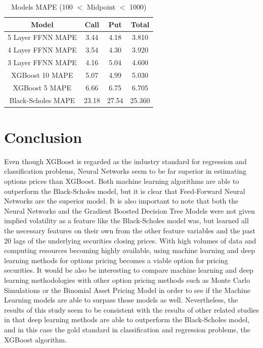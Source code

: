 \documentclass[a4paper]{article}
\begin{document}
\begin{table}[htbp]
\centering
\caption{Models MAPE (100 $<$ Midpoint $<$ 1000)}
\label{table:modelcomparison_mape_filt}
\begin{tabular}{cccc}
\hline
Model & Call & Put & Total \\
\hline
5 Layer FFNN MAPE & 3.44 & 4.18 & 3.810 \\
4 Layer FFNN MAPE & 3.54 & 4.30 & 3.920 \\
3 Layer FFNN MAPE & 4.16 & 5.04 & 4.600 \\
XGBoost 10 MAPE & 5.07 & 4.99 & 5.030 \\
XGBoost 5 MAPE & 6.66 & 6.75 & 6.705 \\
Black-Scholes MAPE & 23.18 & 27.54 & 25.360 \\
\hline
\end{tabular}
\end{table}

\section{Conclusion}
Even though XGBoost is regarded as the industry standard for regression and classification problems, Neural Networks seem to be far superior in estimating options prices than XGBoost. Both machine learning algorithms are able to outperform the Black-Scholes model, but it is clear that Feed-Forward Neural Networks are the superior model. It is also important to note that both the Neural Networks and the Gradient Boosted Decision Tree Models were not given implied volatility as a feature like the Black-Scholes model was, but learned all the necessary features on their own from the other feature variables and the past 20 lags of the underlying securities closing prices. With high volumes of data and computing resources becoming highly available, using machine learning and deep learning methods for options pricing becomes a viable option for pricing securities. It would be also be interesting to compare machine learning and deep learning methodologies with other option pricing methods such as Monte Carlo Simulations or the Binomial Asset Pricing Model in order to see if the Machine Learning models are able to surpass those models as well. Nevertheless, the results of this study seem to be consistent with the results of other related studies in that deep learning methods are able to outperform the Black-Scholes model, and in this case the gold standard in classification and regression problems, the XGBoost algorithm.
\end{document}

